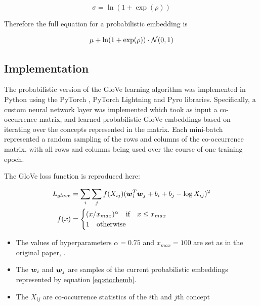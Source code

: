\begin{equation}
    \sigma = \ln (1 + \exp (\rho))
\end{equation}

Therefore the full equation for a probabilistic embedding is 

\begin{equation}
\label{eq:stochemb}
    \mu + \ln (1 + \exp(\rho)) \cdot \mathcal{N}(0, 1)
\end{equation}

\subsection{Implementation}

The probabilistic version of the GloVe learning algorithm was implemented in Python using the PyTorch \cite{pytorch}, PyTorch Lightning \cite{pytorchlightning} and Pyro \cite{pyro} libraries. Specifically, a custom neural network layer was implemented which took as input a co-occurrence matrix, and learned probabilistic GloVe embeddings based on iterating over the concepts represented in the matrix. Each mini-batch represented a random sampling of the rows and columns of the co-occurrence matrix, with all rows and columns being used over the course of one training epoch. 

The GloVe loss function is reproduced here:

\begin{equation}
\label{eq:gloveloss}
\begin{split}
L_{glove} &= \sum_i \sum_j f(X_{ij}) (\boldsymbol{w}_i^T \boldsymbol{w}_j + b_i + b_j - \log X_{ij})^2\\
f(x) &= \begin{cases}
(x/x_{max})^{\alpha}\quad \text{if} \quad x \le x_{max}\\
1\quad \text{otherwise} \quad
\end{cases}
\end{split}
\end{equation}

\begin{itemize}
    \item The values of hyperparameters $\alpha = 0.75$ and $x_{max} = 100$  are set as in the original paper, \cite{pennington2014glove}. 
    \item The $\boldsymbol{w}_i$ and $\boldsymbol{w}_j$ are samples of the current probabilistic embeddings represented by equation \ref{eq:stochemb}. 
    \item The $X_{ij}$ are co-occurrence statistics of the $i$th and $j$th concept
\end{itemize}

